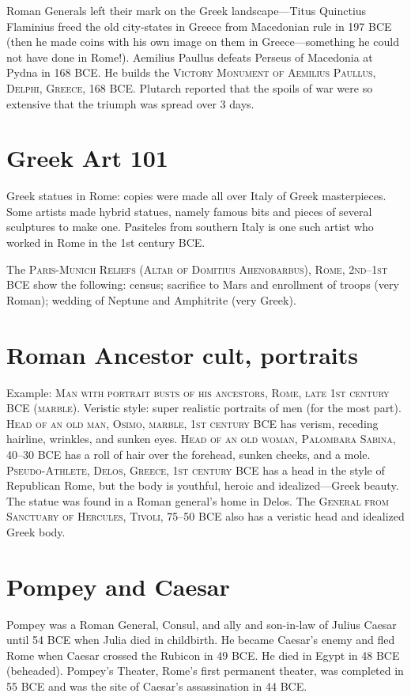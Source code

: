 \documentclass{article}
\begin{document}
Roman Generals left their mark on the Greek landscape---Titus Quinctius Flaminius freed the old city-states in Greece from Macedonian rule in 197 BCE (then he made coins with his own image on them in Greece---something he could not have done in Rome!).  Aemilius Paullus defeats Perseus of Macedonia at Pydna in 168 BCE.  He builds the \textsc{Victory Monument of Aemilius Paullus, Delphi, Greece, 168 BCE}.  Plutarch reported that the spoils of war were so extensive that the triumph was spread over 3 days.
\section{Greek Art 101}
Greek statues in Rome: copies were made all over Italy of Greek masterpieces.  Some artists made hybrid statues, namely famous bits and pieces of several sculptures to make one.  Pasiteles from southern Italy is one such artist who worked in Rome in the 1st century BCE.

The \textsc{Paris-Munich Reliefs (Altar of Domitius Ahenobarbus), Rome, 2nd--1st BCE} show the following: census; sacrifice to Mars and enrollment of troops (very Roman); wedding of Neptune and Amphitrite (very Greek).
\section{Roman Ancestor cult, portraits}
Example: \textsc{Man with portrait busts of his ancestors, Rome, late 1st century BCE (marble)}.  Veristic style: super realistic portraits of men (for the most part).  \textsc{Head of an old man, Osimo, marble, 1st century BCE} has verism, receding hairline, wrinkles, and sunken eyes.  \textsc{Head of an old woman, Palombara Sabina, 40--30 BCE} has a roll of hair over the forehead, sunken cheeks, and a mole.  \textsc{Pseudo-Athlete, Delos, Greece, 1st century BCE} has a head in the style of Republican Rome, but the  body is youthful, heroic and idealized---Greek beauty.  The statue was found in a Roman general's home in Delos.  The \textsc{General from Sanctuary of Hercules, Tivoli, 75--50 BCE} also has a veristic head and idealized Greek body.

\section{Pompey and Caesar}
Pompey was a Roman General, Consul, and ally and son-in-law of Julius Caesar until 54 BCE when Julia died in childbirth.  He became Caesar's enemy and fled Rome when Caesar crossed the Rubicon in 49 BCE.  He died in Egypt in 48 BCE (beheaded).  Pompey's Theater, Rome's first permanent theater, was completed in 55 BCE and was the site of Caesar's assassination in 44 BCE.
\end{document}
